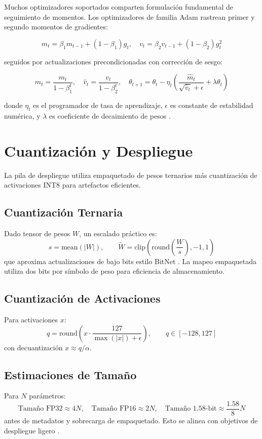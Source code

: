 \documentclass[11pt,a4paper]{article}
\begin{document}
Muchos optimizadores soportados comparten formulación fundamental de seguimiento de momentos. Los optimizadores de familia Adam rastrean primer y segundo momentos de gradientes:

\[
m_t = \beta_1 m_{t-1} + (1-\beta_1)g_t,\quad
v_t = \beta_2 v_{t-1} + (1-\beta_2)g_t^2
\]

seguidos por actualizaciones precondicionadas con corrección de sesgo:

\[
\hat{m}_t = \frac{m_t}{1 - \beta_1^t},\quad
\hat{v}_t = \frac{v_t}{1 - \beta_2^t},\quad
\theta_{t+1} = \theta_t - \eta_t\left(\frac{\hat{m}_t}{\sqrt{\hat{v}_t}+\epsilon} + \lambda\theta_t\right)
\]

donde $\eta_t$ es el programador de tasa de aprendizaje, $\epsilon$ es constante de estabilidad numérica, y $\lambda$ es coeficiente de decaimiento de pesos \citep{loshchilov_decoupled_2017}.

\section{Cuantización y Despliegue}
\label{sec:quantization}

La pila de despliegue utiliza empaquetado de pesos ternarios más cuantización de activaciones INT8 para artefactos eficientes.

\subsection{Cuantización Ternaria}
Dado tensor de pesos $W$, un escalado práctico es:
\[
s=\text{mean}(|W|),\qquad
\tilde{W}=\text{clip}\left(\text{round}\left(\frac{W}{s}\right),-1,1\right)
\]
que aproxima actualizaciones de bajo bits estilo BitNet \citep{wang_bitnet_2023}. La mapeo empaquetada utiliza dos bits por símbolo de peso para eficiencia de almacenamiento.

\subsection{Cuantización de Activaciones}
Para activaciones $x$:
\[
q=\text{round}\left(x\cdot\frac{127}{\max(|x|)+\epsilon}\right),\qquad q\in[-128,127]
\]
con decuantización $x\approx q/\alpha$.

\subsection{Estimaciones de Tamaño}
Para $N$ parámetros:
\[
\text{Tamaño FP32}\approx 4N,\quad \text{Tamaño FP16}\approx 2N,\quad \text{Tamaño 1.58-bit}\approx \frac{1.58}{8}N
\]
antes de metadatos y sobrecarga de empaquetado. Esto se alinea con objetivos de despliegue ligero \citep{samson_lightweight_2026,bravin_embbert_2026}.
\end{document}
